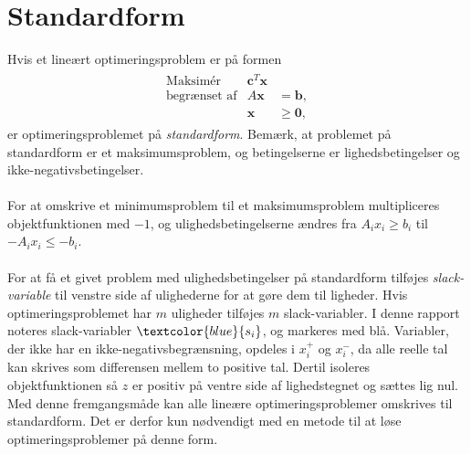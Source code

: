 \section{Standardform}
\label{sec:standard}
% 
Hvis et lineært optimeringsproblem er på formen
%
\begin{align*}
\begin{array}{lrl}
\text{Maksimér}		&\textbf{c}^T\textbf{x}	&				\\
\text{begrænset af}	&A\textbf{x}	&=\mathbf{b},	\\
					&\mathbf{x}				&\geq \mathbf{0},
\end{array}
\end{align*}
%
er optimeringsproblemet på \textit{standardform}.
Bemærk, at problemet på standardform er et maksimumsproblem, og betingelserne er lighedsbetingelser og ikke-negativsbetingelser.
\\\\
%
For at omskrive et minimumsproblem til et maksimumsproblem multipliceres objektfunktionen med $-1$, og ulighedsbetingelserne ændres fra $A_ix_i \geq b_i$ til $-A_ix_i \leq -b_i$.
\\\\
%
For at få et givet problem med ulighedsbetingelser på standardform tilføjes \textit{slack-variable} til venstre side af ulighederne for at gøre dem til ligheder. 
Hvis optimeringsproblemet har $m$ uligheder tilføjes $m$ slack-variabler.
I denne rapport noteres slack-variabler $\textcolor{blue}{s_i}$, og markeres med blå.
Variabler, der ikke har en ikke-negativsbegrænsning, opdeles i $x_i^+$ og $x_i^-$, da alle reelle tal kan skrives som differensen mellem to positive tal.
Dertil isoleres objektfunktionen så $z$ er positiv på ventre side af lighedstegnet og sættes lig nul.
Med denne fremgangsmåde kan alle lineære optimeringsproblemer omskrives til standardform.
Det er derfor kun nødvendigt med en metode til at løse optimeringsproblemer på denne form.
%


